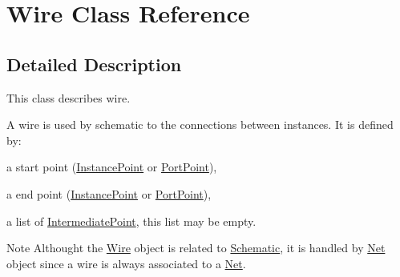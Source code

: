\hypertarget{class_wire}{}\section{Wire Class Reference}
\label{class_wire}


\subsection{Detailed Description}
This class describes wire.

A wire is used by schematic to the connections between instances. It is defined by\+:
\begin{DoxyItemize}
\item a start point (\mbox{\hyperlink{class_instance_point}{Instance\+Point}} or \mbox{\hyperlink{class_port_point}{Port\+Point}}),
\item a end point (\mbox{\hyperlink{class_instance_point}{Instance\+Point}} or \mbox{\hyperlink{class_port_point}{Port\+Point}}),
\item a list of \mbox{\hyperlink{class_intermediate_point}{Intermediate\+Point}}, this list may be empty.
\end{DoxyItemize}

\begin{DoxyNote}{Note}
Althought the \mbox{\hyperlink{class_wire}{Wire}} object is related to \mbox{\hyperlink{class_schematic}{Schematic}}, it is handled by \mbox{\hyperlink{class_net}{Net}} object since a wire is always associated to a \mbox{\hyperlink{class_net}{Net}}. 
\end{DoxyNote}
